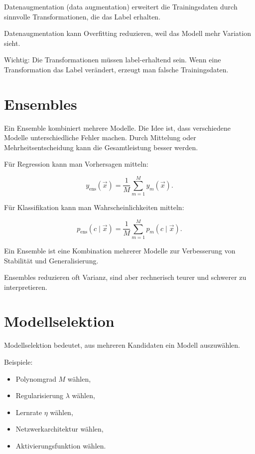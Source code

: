 \begin{definitionbox}
Datenaugmentation (data augmentation) erweitert die Trainingsdaten durch sinnvolle Transformationen, die das Label erhalten.
\end{definitionbox}

\begin{conceptbox}
Datenaugmentation kann Overfitting reduzieren, weil das Modell mehr Variation sieht.
\end{conceptbox}

Wichtig:
Die Transformationen müssen label-erhaltend sein.
Wenn eine Transformation das Label verändert, erzeugt man falsche Trainingsdaten.

\section{Ensembles}

Ein Ensemble kombiniert mehrere Modelle.
Die Idee ist, dass verschiedene Modelle unterschiedliche Fehler machen.
Durch Mittelung oder Mehrheitsentscheidung kann die Gesamtleistung besser werden.

Für Regression kann man Vorhersagen mitteln:

\[
    y_{\mathrm{ens}}(\vec{x})
    =
    \frac{1}{M}
    \sum_{m=1}^{M}
    y_m(\vec{x}).
\]

Für Klassifikation kann man Wahrscheinlichkeiten mitteln:

\[
    p_{\mathrm{ens}}(c\mid\vec{x})
    =
    \frac{1}{M}
    \sum_{m=1}^{M}
    p_m(c\mid\vec{x}).
\]

\begin{definitionbox}
Ein Ensemble ist eine Kombination mehrerer Modelle zur Verbesserung von Stabilität und Generalisierung.
\end{definitionbox}

\begin{notebox}
Ensembles reduzieren oft Varianz, sind aber rechnerisch teurer und schwerer zu interpretieren.
\end{notebox}

\section{Modellselektion}

Modellselektion bedeutet, aus mehreren Kandidaten ein Modell auszuwählen.

Beispiele:

\begin{itemize}
    \item Polynomgrad \(M\) wählen,
    \item Regularisierung \(\lambda\) wählen,
    \item Lernrate \(\eta\) wählen,
    \item Netzwerkarchitektur wählen,
    \item Aktivierungsfunktion wählen.
\end{itemize}

